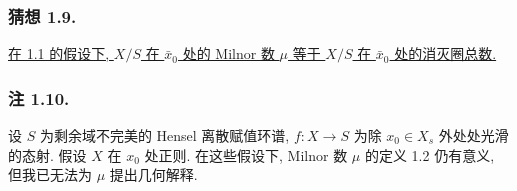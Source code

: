 \subsubsection*{猜想 1.9.}
\underline{在 1.1 的假设下, $X/S$ 在 $\bar x_0$ 处的 Milnor 数 $\mu$ 等于 $X/S$ 在 $\bar x_0$ 处的消灭圈总数.}

\subsubsection*{注 1.10.}
设 $S$ 为剩余域不完美的 Hensel 离散赋值环谱, $f:X\to S$ 为除 $x_0\in X_s$ 外处处光滑的态射. 假设 $X$ 在 $x_0$ 处正则. 在这些假设下, Milnor 数 $\mu$ 的定义 1.2 仍有意义, 但我已无法为 $\mu$ 提出几何解释.
